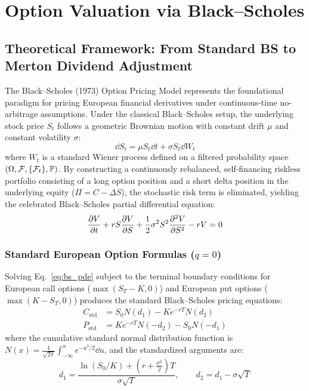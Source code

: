 
\chapter{Option Valuation via Black--Scholes}
\label{ch:black_scholes}

\section{Theoretical Framework: From Standard BS to Merton Dividend Adjustment}
\label{sec:bs_theoretical}

The Black--Scholes (1973) Option Pricing Model represents the foundational paradigm for pricing European financial derivatives under continuous-time no-arbitrage assumptions. Under the classical Black--Scholes setup, the underlying stock price $S_t$ follows a geometric Brownian motion with constant drift $\mu$ and constant volatility $\sigma$:
\begin{equation}
\dd S_t = \mu S_t \dd t + \sigma S_t \dd W_t
\label{eq:gbm}
\end{equation}
where $W_t$ is a standard Wiener process defined on a filtered probability space $(\Omega, \mathcal{F}, \{\mathcal{F}_t\}, \mathbb{P})$. By constructing a continuously rebalanced, self-financing riskless portfolio consisting of a long option position and a short delta position in the underlying equity ($\Pi = C - \Delta S$), the stochastic risk term is eliminated, yielding the celebrated Black--Scholes partial differential equation:
\begin{equation}
\frac{\partial V}{\partial t} + r S \frac{\partial V}{\partial S} + \frac{1}{2} \sigma^2 S^2 \frac{\partial^2 V}{\partial S^2} - r V = 0
\label{eq:bs_pde}
\end{equation}

\subsection{Standard European Option Formulas ($q = 0$)}

Solving Eq.~\eqref{eq:bs_pde} subject to the terminal boundary conditions for European call options ($\max(S_T - K, 0)$) and European put options ($\max(K - S_T, 0)$) produces the standard Black--Scholes pricing equations:
\begin{align}
C_{\text{std}} &= S_0 N(d_1) - K e^{-r T} N(d_2) \label{eq:bs_std_call} \\
P_{\text{std}} &= K e^{-r T} N(-d_2) - S_0 N(-d_1) \label{eq:bs_std_put}
\end{align}
where the cumulative standard normal distribution function is $N(x) = \frac{1}{\sqrt{2\pi}} \int_{-\infty}^{x} e^{-u^2/2} \dd u$, and the standardized arguments are:
\begin{equation}
d_1 = \frac{\ln(S_0 / K) + \left(r + \frac{\sigma^2}{2}\right)T}{\sigma \sqrt{T}}, \qquad d_2 = d_1 - \sigma \sqrt{T}
\label{eq:d1_d2_std}
\end{equation}

